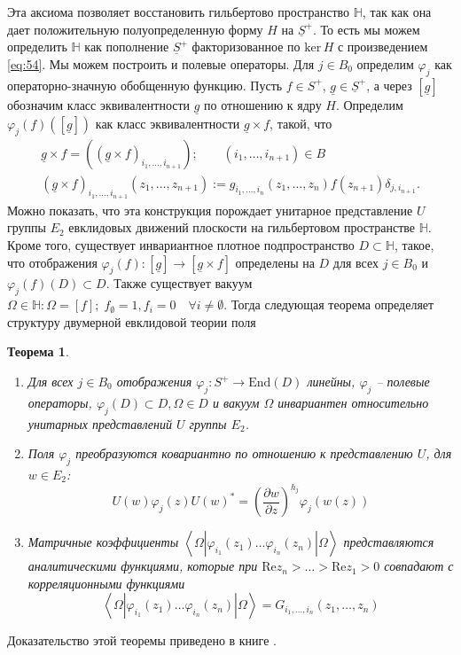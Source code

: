 \documentclass[12pt]{article}
\newtheorem{theorem}{Теорема}
\begin{document}
Эта аксиома позволяет восстановить гильбертово пространство $\mathbb{H}$, так как она дает
положительную полуопределенную форму $H$ на $\underline{S}^{+}$. То есть мы можем определить
$\mathbb{H}$ как пополнение $\underline{S}^{+}$ факторизованное по $\mathrm{ker}\, H$ с
произведением \eqref{eq:54}. Мы можем построить и полевые операторы. Для $j\in B_{0}$ определим
$\varphi_{j}$ как операторно-значную обобщенную функцию. Пусть $f\in S^{+}$,
$\underline{g}\in\underline{S}^{+}$, а через $[\underline{g}]$ обозначим класс эквивалентности
$\underline{g}$ по отношению к ядру $H$. Определим $\varphi_{j}(f)([\underline{g}])$ как класс
эквивалентности $\underline{g}\times f$, такой, что
\begin{equation}
  \label{eq:55}
  \begin{array}{l}
    \underline{g}\times f=((\underline{g}\times f)_{i_{1},\dots,i_{n+1}});\quad\quad (i_{1},\dots,i_{n+1})\in B\\
    (\underline{g}\times f)_{i_{1},\dots,i_{n+1}}(z_{1},\dots,z_{n+1}):=g_{i_{1},\dots,i_{n}}(z_{1},\dots,z_{n})f(z_{n+1})\delta_{j,i_{n+1}}.
  \end{array}
\end{equation}
Можно показать, что эта конструкция порождает унитарное представление $U$ группы $E_{2}$ евклидовых
движений плоскости на гильбертовом пространстве $\mathbb{H}$. Кроме того, существует инвариантное
плотное подпространство $D\subset \mathbb{H}$, такое, что отображения
$\varphi_{j}(f):[\underline{g}]\to [\underline{g}\times f]$ определены на $D$ для всех $j\in B_{0}$
и $\varphi_{j}(f)(D)\subset D$. Также существует вакуум $\Omega\in\mathbb{H}: \Omega=[f];\;
f_{\emptyset}=1, f_{i}=0\quad \forall i\neq \emptyset$. Тогда следующая теорема определяет структуру
двумерной евклидовой теории поля
\begin{theorem}
  \begin{enumerate}
  \item Для всех $j\in B_{0}$ отображения $\varphi_{j}:S^{+}\to \mathrm{End}(D)$ линейны, $\varphi_{j}$ -- полевые операторы, $\varphi_{j}(D)\subset D, \Omega\in D$ и вакуум $\Omega$ инвариантен относительно унитарных представлений $U$ группы $E_{2}$.
  \item Поля $\varphi_{j}$ преобразуются ковариантно по отношению к представлению $U$, для $w\in E_{2}$:
    \begin{equation}
      \label{eq:57}
      U(w)\varphi_{j}(z)U(w)^{*}=\left(\frac{\partial w}{\partial z}\right)^{h_{j}}\varphi_{j}(w(z))
    \end{equation}
  \item Матричные коэффициенты $\left<\Omega|\varphi_{i_{1}}(z_{1})\dots \varphi_{i_{n}}(z_{n})|\Omega\right>$ представляются аналитическими функциями, которые при $\mathrm{Re}z_{n}>\dots>\mathrm{Re}z_{1}>0$ совпадают с корреляционными функциями
  \begin{equation}
    \label{eq:56}
    \left<\Omega|\varphi_{i_{1}}(z_{1})\dots \varphi_{i_{n}}(z_{n})|\Omega\right>=G_{i_{1},\dots,i_{n}}(z_{1},\dots,z_{n})
  \end{equation}
  \end{enumerate}
\end{theorem}
Доказательство этой теоремы приведено в книге \cite{schottenloher2008mathematical}.
\end{document}
